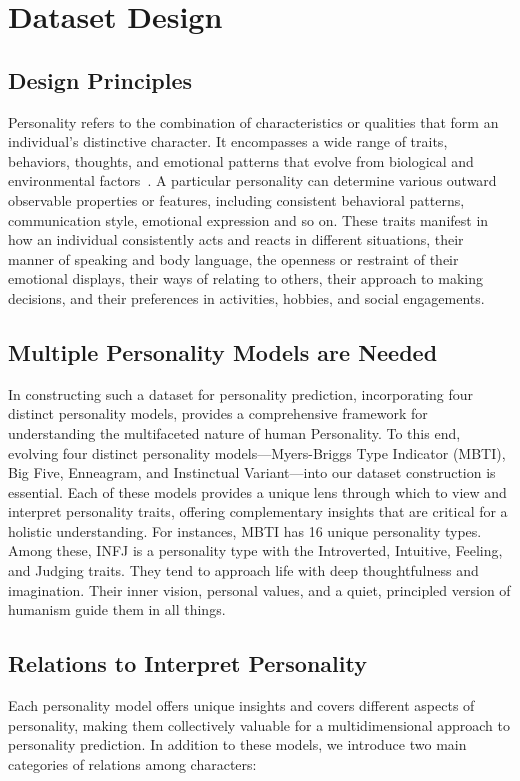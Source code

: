 \section{Dataset Design}
\subsection{Design Principles}
Personality refers to the combination of characteristics or qualities that form an individual's distinctive character. It encompasses a wide range of traits, behaviors, thoughts, and emotional patterns that evolve from biological and environmental factors~\cite{6406319}. A particular personality can determine various outward observable properties or features, including consistent behavioral patterns, communication style, emotional expression and so on. These traits manifest in how an individual consistently acts and reacts in different situations, their manner of speaking and body language, the openness or restraint of their emotional displays, their ways of relating to others, their approach to making decisions, and their preferences in activities, hobbies, and social engagements.
\subsection{Multiple Personality Models are Needed} 
In constructing such a dataset for personality prediction, incorporating four distinct personality models, provides a comprehensive framework for understanding the multifaceted nature of human Personality. To this end, evolving four distinct personality models—Myers-Briggs Type Indicator (MBTI), Big Five, Enneagram, and Instinctual Variant—into our dataset construction is essential. Each of these models provides a unique lens through which to view and interpret personality traits, offering complementary insights that are critical for a holistic understanding. For instances, MBTI has 16 unique personality types. Among these, INFJ is a personality type with the Introverted, Intuitive, Feeling, and Judging traits. They tend to approach life with deep thoughtfulness and imagination. Their inner vision, personal values, and a quiet, principled version of humanism guide them in all things.
\subsection{Relations to Interpret Personality}

Each personality model offers unique insights and covers different aspects of personality, making them collectively valuable for a multidimensional approach to personality prediction. In addition to these models, we introduce two main categories of relations among characters:

